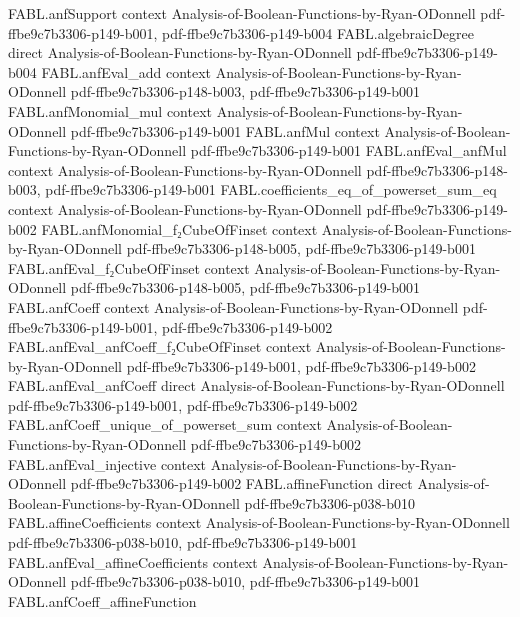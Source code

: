 \begin{theorem}
\proofstep
  {FABL.anfSupport}
  {context}
  {Analysis-of-Boolean-Functions-by-Ryan-ODonnell}
  {pdf-ffbe9c7b3306-p149-b001,
    pdf-ffbe9c7b3306-p149-b004}
\proofstep
  {FABL.algebraicDegree}
  {direct}
  {Analysis-of-Boolean-Functions-by-Ryan-ODonnell}
  {pdf-ffbe9c7b3306-p149-b004}
\proofstep
  {FABL.anfEval_add}
  {context}
  {Analysis-of-Boolean-Functions-by-Ryan-ODonnell}
  {pdf-ffbe9c7b3306-p148-b003,
    pdf-ffbe9c7b3306-p149-b001}
\proofstep
  {FABL.anfMonomial_mul}
  {context}
  {Analysis-of-Boolean-Functions-by-Ryan-ODonnell}
  {pdf-ffbe9c7b3306-p149-b001}
\proofstep
  {FABL.anfMul}
  {context}
  {Analysis-of-Boolean-Functions-by-Ryan-ODonnell}
  {pdf-ffbe9c7b3306-p149-b001}
\proofstep
  {FABL.anfEval_anfMul}
  {context}
  {Analysis-of-Boolean-Functions-by-Ryan-ODonnell}
  {pdf-ffbe9c7b3306-p148-b003,
    pdf-ffbe9c7b3306-p149-b001}
\proofstep
  {FABL.coefficients_eq_of_powerset_sum_eq}
  {context}
  {Analysis-of-Boolean-Functions-by-Ryan-ODonnell}
  {pdf-ffbe9c7b3306-p149-b002}
\proofstep
  {FABL.anfMonomial_f₂CubeOfFinset}
  {context}
  {Analysis-of-Boolean-Functions-by-Ryan-ODonnell}
  {pdf-ffbe9c7b3306-p148-b005,
    pdf-ffbe9c7b3306-p149-b001}
\proofstep
  {FABL.anfEval_f₂CubeOfFinset}
  {context}
  {Analysis-of-Boolean-Functions-by-Ryan-ODonnell}
  {pdf-ffbe9c7b3306-p148-b005,
    pdf-ffbe9c7b3306-p149-b001}
\proofstep
  {FABL.anfCoeff}
  {context}
  {Analysis-of-Boolean-Functions-by-Ryan-ODonnell}
  {pdf-ffbe9c7b3306-p149-b001,
    pdf-ffbe9c7b3306-p149-b002}
\proofstep
  {FABL.anfEval_anfCoeff_f₂CubeOfFinset}
  {context}
  {Analysis-of-Boolean-Functions-by-Ryan-ODonnell}
  {pdf-ffbe9c7b3306-p149-b001,
    pdf-ffbe9c7b3306-p149-b002}
\proofstep
  {FABL.anfEval_anfCoeff}
  {direct}
  {Analysis-of-Boolean-Functions-by-Ryan-ODonnell}
  {pdf-ffbe9c7b3306-p149-b001,
    pdf-ffbe9c7b3306-p149-b002}
\proofstep
  {FABL.anfCoeff_unique_of_powerset_sum}
  {context}
  {Analysis-of-Boolean-Functions-by-Ryan-ODonnell}
  {pdf-ffbe9c7b3306-p149-b002}
\proofstep
  {FABL.anfEval_injective}
  {context}
  {Analysis-of-Boolean-Functions-by-Ryan-ODonnell}
  {pdf-ffbe9c7b3306-p149-b002}
\proofstep
  {FABL.affineFunction}
  {direct}
  {Analysis-of-Boolean-Functions-by-Ryan-ODonnell}
  {pdf-ffbe9c7b3306-p038-b010}
\proofstep
  {FABL.affineCoefficients}
  {context}
  {Analysis-of-Boolean-Functions-by-Ryan-ODonnell}
  {pdf-ffbe9c7b3306-p038-b010,
    pdf-ffbe9c7b3306-p149-b001}
\proofstep
  {FABL.anfEval_affineCoefficients}
  {context}
  {Analysis-of-Boolean-Functions-by-Ryan-ODonnell}
  {pdf-ffbe9c7b3306-p038-b010,
    pdf-ffbe9c7b3306-p149-b001}
\proofstep
  {FABL.anfCoeff_affineFunction}

\end{theorem}
